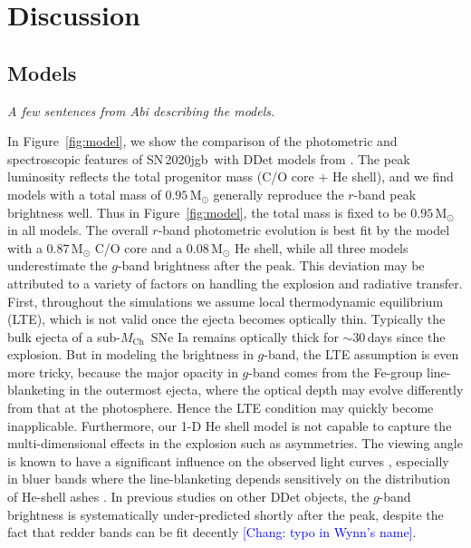 \documentclass[twocolumn]{aastex631}
\newcommand{\sn}{SN\,2020jgb}
\newcommand{\Mch}{$M_\mathrm{Ch}$}
\newcommand{\chang}[1]{\textcolor{blue}{[Chang: #1]}}
\begin{document}
\section{Discussion} \label{sec:discussion}
\subsection{Models} \label{sec:model}
{\it A few sentences from Abi describing the models.}

In Figure~\ref{fig:model}, we show the comparison of the photometric and spectroscopic features of \sn\ with DDet models from \citet{polin_observational_2019}. The peak luminosity reflects the total progenitor mass (C/O core $+$ He shell), and we find models with a total mass of $0.95\,\mathrm{M_\odot}$ generally reproduce the $r$-band peak brightness well. Thus in Figure~\ref{fig:model}, the total mass is fixed to be $0.95\,\mathrm{M_\odot}$ in all models. The overall $r$-band photometric evolution is best fit by the model with a $0.87\,\mathrm{M_\odot}$ C/O core and a $0.08\,\mathrm{M_\odot}$ He shell, while all three models underestimate the $g$-band brightness after the peak. This deviation may be attributed to a variety of factors on handling the explosion and radiative transfer. First, throughout the simulations we assume local thermodynamic equilibrium (LTE), which is not valid once the ejecta becomes optically thin. Typically the bulk ejecta of a sub-\Mch\ SNe Ia remains optically thick for $\sim$30\,days since the explosion. But in modeling the brightness in $g$-band, the LTE assumption is even more tricky, because the major opacity in $g$-band comes from the Fe-group line-blanketing in the outermost ejecta, where the optical depth may evolve differently from that at the photosphere. Hence the LTE condition may quickly become inapplicable. Furthermore, our 1-D He shell model is not capable to capture the multi-dimensional effects in the explosion such as asymmetries. The viewing angle is known to have a significant influence on the observed light curves \citep{Kromer_DD_2010, Sim_2012, Gronow_2020, Shen_2021}, especially in bluer bands where the line-blanketing depends sensitively on the distribution of He-shell ashes \citep{Shen_2021}. In previous studies on other DDet objects, the $g$-band brightness is systematically under-predicted shortly after the peak, despite the fact that redder bands can be fit decently \citep[e.g.][]{jiang_16jhr_2017,jacobson-galan_16hnk_2020} \chang{typo in Wynn's name}.
\end{document}

